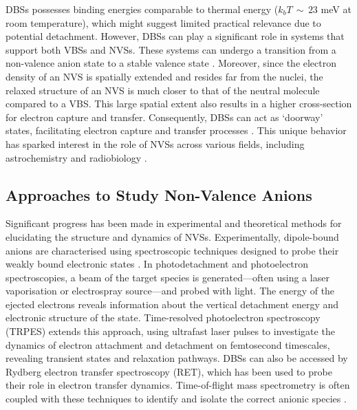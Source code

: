DBSs possesses binding energies comparable to thermal energy ($k_bT\,\sim\,23$ meV at room temperature), which might suggest limited practical relevance due to potential detachment. However, DBSs can play a significant role in systems that support both VBSs and NVSs. These systems can undergo a transition from a non-valence anion state to a stable valence state \cite{herbert2015quantum,jordan2003theory}. Moreover, since the electron density of an NVS is spatially extended and resides far from the nuclei, the relaxed structure of an NVS is much closer to that of the neutral molecule compared to a VBS. This large spatial extent also results in a higher cross-section for electron capture and transfer. Consequently, DBSs can act as `doorway' states, facilitating electron capture and transfer processes \cite{hendricks1998dipole,sommerfeld2002coupling,jordan2003theory,sommerfeld2004intramolecular,sommerfeld2005dipole,simons2008molecular,verlet2020role,kang2022state,hassan2022associative,simons2023molecular}. This unique behavior has sparked interest in the role of NVSs across various fields, including astrochemistry \cite{fortenberry2015interstellar} and radiobiology \cite{gu2012interactions,narayanan2023secondary,sedmidubska2024interaction}.

\subsection{Approaches to Study Non-Valence Anions}
Significant progress has been made in experimental and theoretical methods for elucidating the structure and dynamics of NVSs. \cite{desfranccois1995determination,simons2008molecular,simons2023molecular} Experimentally, dipole-bound anions are characterised using spectroscopic techniques designed to probe their weakly bound electronic states \cite{liu2020photoelectron,rogers2019photoelectron,clarke2024dynamics}. In photodetachment and photoelectron spectroscopies, a beam of the target species is generated—often using a laser vaporisation or electrospray source—and probed with light. The energy of the ejected electrons reveals information about the vertical detachment energy and electronic structure of the state. Time-resolved photoelectron spectroscopy (TRPES)\cite{cyr1996femtosecond,neumark2001time} extends this approach, using ultrafast laser pulses to investigate the dynamics of electron attachment and detachment on femtosecond timescales, revealing transient states and relaxation pathways. DBSs can also be accessed by Rydberg electron transfer spectroscopy (RET)\cite{carles2001rydberg,eustis2007photoelectron,bradforth2002excited}, which has been used to probe their role in electron transfer dynamics. Time-of-flight mass spectrometry is often coupled with these techniques to identify and isolate the correct anionic species \cite{desfranccois1996abdoul,ameixa2023parent,pshenichnyuk2020ionizing}.

